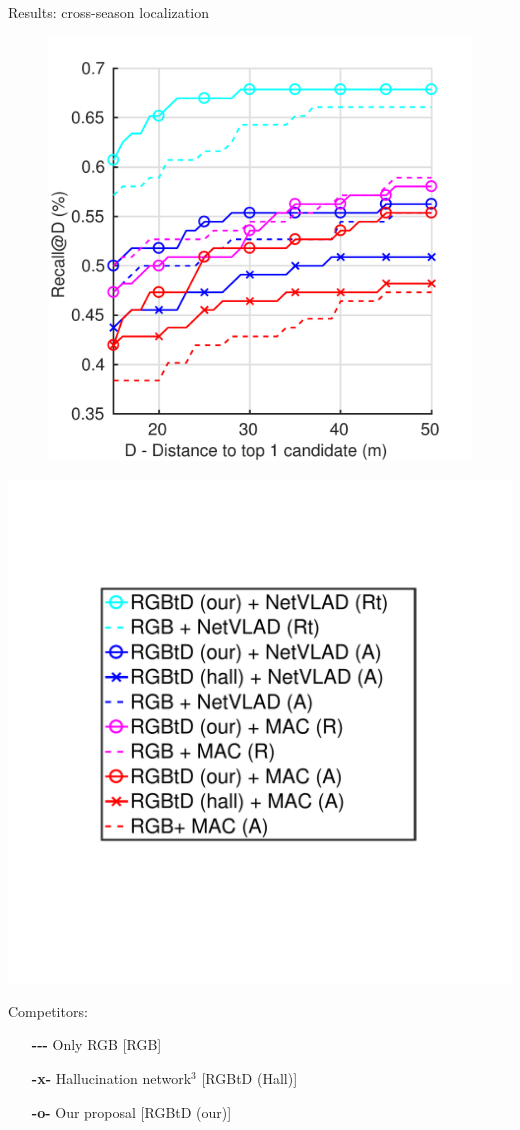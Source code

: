 \begin{frame}{Results: cross-season localization}
	\begin{minipage}{0.49\linewidth}
		\centering
		\begin{figure}
			\includegraphics[width=0.9\linewidth]{vect/res/snow}
		\end{figure}
	\end{minipage}\hfill
	\begin{minipage}{0.49\linewidth}
		\includegraphics[trim={90 140 95 100},clip,width=0.5\linewidth]{vect/res/legend}		
		\vspace{0.5cm}		
				
		Competitors:
		\begin{itemize}
			\item[\textbf{-{}-{}-}] Only RGB [RGB]
			\item[\textbf{-x-}] Hallucination network$^3$ [RGBtD (Hall)]
			\item[\textbf{-o-}] Our proposal [RGBtD (our)]
		\end{itemize}
	\end{minipage}
\end{frame}

